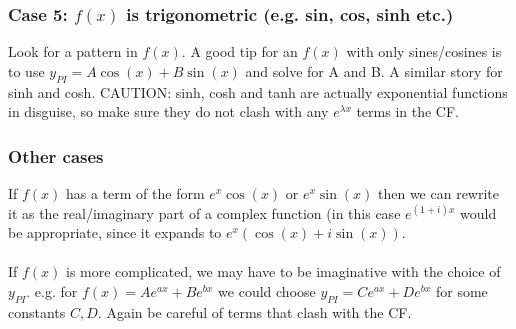 \documentclass{scrartcl}
\begin{document}
\subsubsection*{Case 5: $ f(x) $ is trigonometric (e.g. sin, cos, sinh etc.)}
Look for a pattern in $ f(x) $. A good tip for an $ f(x) $ with only sines/cosines is to use $ y_{PI} = A\cos(x) + B\sin(x) $ and solve for A and B. A similar story for sinh and cosh.
CAUTION: sinh, cosh and tanh are actually exponential functions in disguise, so make sure they do not clash with any $ e^{\lambda x} $ terms in the CF.

\subsubsection*{Other cases}
If $ f(x) $ has a term of the form $ e^{x}\cos(x) $ or $ e^{x}\sin(x) $ then we can rewrite it as the real/imaginary part of a complex function (in this case $ e^{(1+i)x} $ would be appropriate, since it expands to $ e^{x}(\cos(x) + i\sin(x)) $.
\\\\
If $ f(x) $ is more complicated, we may have to be imaginative with the choice of $ y_{PI} $. e.g. for $ f(x) = Ae^{ax} + Be^{bx} $ we could choose $ y_{PI} = Ce^{ax} + De^{bx} $ for some constants $ C, D $. Again be careful of terms that clash with the CF.
\end{document}
